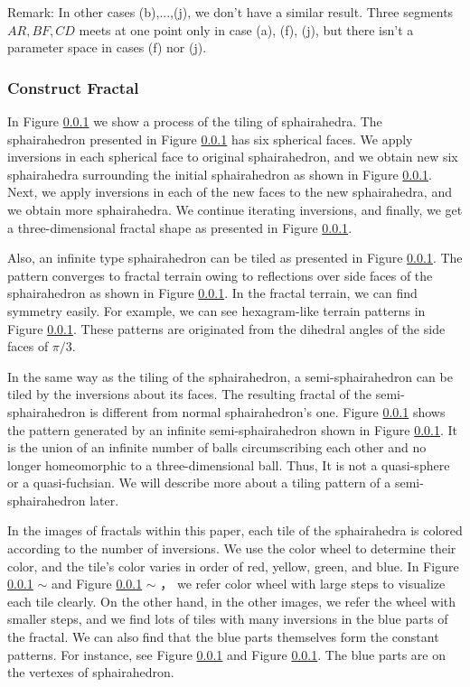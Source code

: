 \documentclass[dvipdfmx]{interact}
\theoremstyle{plain}%
\theoremstyle{definition}
\theoremstyle{remark}
\theoremstyle{problemstyle}
\begin{document}
Remark:
In other cases (b),...,(j), we don't have a similar result. Three
segments $AR, BF, CD$ meets at one point only in case (a), (f), (j), but
there isn't a parameter space in cases (f) nor (j).

\subsubsection{Construct Fractal}

In Figure \ref{} we show a process of the tiling of
sphairahedra.
The sphairahedron presented in Figure
\ref{}\subref{} has six spherical
faces.
We apply inversions in each spherical face to original sphairahedron,
and we obtain new six sphairahedra surrounding the initial sphairahedron
as shown in Figure
\ref{}\subref{}.
Next, we apply inversions in each of the new faces to the new sphairahedra,
and we obtain more sphairahedra.
We continue iterating inversions, and finally, we get a three-dimensional
fractal shape as presented in Figure
\ref{}\subref{}.

Also, an infinite type sphairahedron can be tiled as presented in Figure
\ref{}.
The pattern converges to fractal terrain owing to reflections over side
faces of the sphairahedron as shown in Figure \ref{}.
In the fractal terrain, we can find symmetry easily.
For example, we can see hexagram-like terrain patterns in Figure
\ref{}.
These patterns are originated from the dihedral angles of the side faces of
$\pi / 3$.

In the same way as the tiling of the sphairahedron, a semi-sphairahedron
can be tiled by the inversions about its faces.
The resulting fractal of the semi-sphairahedron is different from normal
sphairahedron's one.
Figure \ref{} shows the pattern
generated by an infinite semi-sphairahedron shown in Figure 
\ref{}.
It is the union of an infinite number of balls
circumscribing each other and no longer homeomorphic
to a three-dimensional ball.
Thus, It is not a quasi-sphere or a quasi-fuchsian.
We will describe more about a tiling pattern of a semi-sphairahedron later.

In the images of fractals within this paper, each tile of the
sphairahedra is colored according to the
number of inversions.
We use the color wheel to determine their color,
and the tile's color varies in order of red, yellow, green, and blue.
In Figure \ref{}\subref{} $\sim$
\subref{} and
Figure \ref{}\subref{}
$\sim$ \subref{}，
we refer color wheel with large steps to visualize each tile clearly.
On the other hand, in the other images, we refer the wheel with smaller
steps, and we find lots of tiles with many inversions in the blue
parts of the fractal.
We can also find that the blue parts themselves form the constant
patterns.
For instance, see Figure \ref{} and Figure \ref{}.
The blue parts are on the vertexes of sphairahedron.
\end{document}
